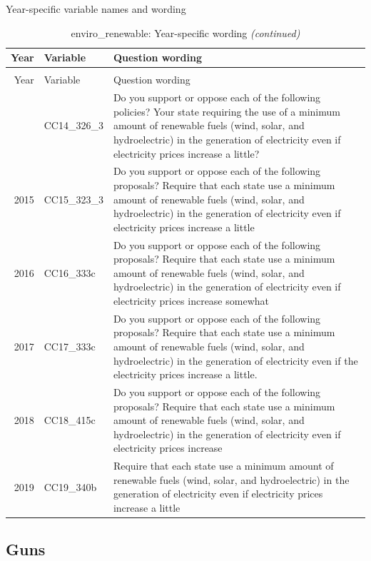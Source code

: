 \documentclass[12pt]{article}
\begin{document}
Year-specific variable names and wording

\begin{longtable}[t]{rl>{\raggedright\arraybackslash}p{10cm}}
\caption{\label{tab:unnamed-chunk-4}enviro\_renewable: Year-specific wording}\\
\toprule
Year & Variable & Question wording\\
\midrule
\endfirsthead
\caption[]{enviro\_renewable: Year-specific wording \textit{(continued)}}\\
\toprule
Year & Variable & Question wording\\
\midrule
\endhead
\
\endfoot
\bottomrule
\endlastfoot
2014 & CC14\_326\_3 & Do you support or oppose each of the following policies? Your state requiring the use of a minimum amount of renewable fuels (wind, solar, and hydroelectric) in the generation of electricity even if electricity prices increase a little?\\
2015 & CC15\_323\_3 & Do you support or oppose each of the following proposals? Require that each state use a minimum amount of renewable fuels (wind, solar, and hydroelectric) in the generation of electricity even if electricity prices increase a little\\
2016 & CC16\_333c & Do you support or oppose each of the following proposals? Require that each state use a minimum amount of renewable fuels (wind, solar, and hydroelectric) in the generation of electricity even if electricity prices increase somewhat\\
2017 & CC17\_333c & Do you support or oppose each of the following proposals? Require that each state use a minimum amount of renewable fuels (wind, solar, and hydroelectric) in the generation of electricity even if the electricity prices increase a little.\\
2018 & CC18\_415c & Do you support or oppose each of the following proposals? Require that each state use a minimum amount of renewable fuels (wind, solar, and hydroelectric) in the generation of electricity even if electricity prices increase\\
2019 & CC19\_340b & Require that each state use a minimum amount of renewable fuels (wind, solar, and hydroelectric) in the generation of electricity even if electricity prices increase a little\\*
\end{longtable}\newpage

\subsection{Guns}\label{guns}
\end{document}
